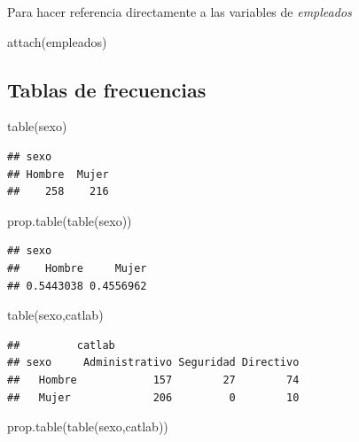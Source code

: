 \documentclass[
]{book}
\newenvironment{Shaded}{\begin{snugshade}}{\end{snugshade}}
\newcommand{\FunctionTok}[1]{\textcolor[rgb]{0.00,0.00,0.00}{#1}}
\newcommand{\NormalTok}[1]{#1}
\theoremstyle{break}
\theoremstyle{nonumberplain}
\begin{document}
Para hacer referencia directamente a las variables de \emph{empleados}

\begin{Shaded}
\begin{Highlighting}[]
\FunctionTok{attach}\NormalTok{(empleados)}
\end{Highlighting}
\end{Shaded}

\hypertarget{tablas-de-frecuencias}{%
\subsection{Tablas de frecuencias}\label{tablas-de-frecuencias}}

\begin{Shaded}
\begin{Highlighting}[]
\FunctionTok{table}\NormalTok{(sexo)}
\end{Highlighting}
\end{Shaded}

\begin{verbatim}
## sexo
## Hombre  Mujer 
##    258    216
\end{verbatim}

\begin{Shaded}
\begin{Highlighting}[]
\FunctionTok{prop.table}\NormalTok{(}\FunctionTok{table}\NormalTok{(sexo))}
\end{Highlighting}
\end{Shaded}

\begin{verbatim}
## sexo
##    Hombre     Mujer 
## 0.5443038 0.4556962
\end{verbatim}

\begin{Shaded}
\begin{Highlighting}[]
\FunctionTok{table}\NormalTok{(sexo,catlab)}
\end{Highlighting}
\end{Shaded}

\begin{verbatim}
##         catlab
## sexo     Administrativo Seguridad Directivo
##   Hombre            157        27        74
##   Mujer             206         0        10
\end{verbatim}

\begin{Shaded}
\begin{Highlighting}[]
\FunctionTok{prop.table}\NormalTok{(}\FunctionTok{table}\NormalTok{(sexo,catlab))}
\end{Highlighting}
\end{Shaded}
\end{document}
